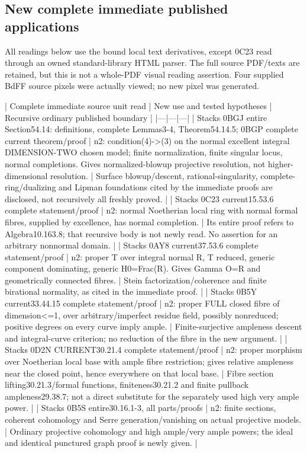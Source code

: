 \documentclass[11pt]{article}
\begin{document}
\subsection*{New complete immediate published applications}

All readings below use the bound local text derivatives, except 0C23 read through an owned standard-library HTML parser. The full source PDF/texts are retained, but this is not a whole-PDF visual reading assertion. Four supplied BdFF source pixels were actually viewed; no new pixel was generated.

| Complete immediate source unit read | New use and tested hypotheses | Recursive ordinary published boundary |
|---|---|---|
| Stacks 0BGJ entire Section54.14: definitions, complete Lemmas3-4, Theorem54.14.5; 0BGP complete current theorem/proof | n2: condition(4)->(3) on the normal excellent integral DIMENSION-TWO chosen model; finite normalization, finite singular locus, normal completions. Gives normalized-blowup projective resolution, not higher-dimensional resolution. | Surface blowup/descent, rational-singularity, complete-ring/dualizing and Lipman foundations cited by the immediate proofs are disclosed, not recursively all freshly proved. |
| Stacks 0C23 current15.53.6 complete statement/proof | n2: normal Noetherian local ring with normal formal fibres, supplied by excellence, has normal completion. | Its entire proof refers to Algebra10.163.8; that recursive body is not newly read. No assertion for an arbitrary nonnormal domain. |
| Stacks 0AY8 current37.53.6 complete statement/proof | n2: proper T over integral normal R, T reduced, generic component dominating, generic H0=Frac(R). Gives Gamma O=R and geometrically connected fibres. | Stein factorization/coherence and finite birational normality, as cited in the immediate proof. |
| Stacks 0B5Y current33.44.15 complete statement/proof | n2: proper FULL closed fibre of dimension<=1, over arbitrary/imperfect residue field, possibly nonreduced; positive degrees on every curve imply ample. | Finite-surjective ampleness descent and integral-curve criterion; no reduction of the fibre in the new argument. |
| Stacks 0D2N CURRENT30.21.4 complete statement/proof | n2: proper morphism over Noetherian local base with ample fibre restriction; gives relative ampleness near the closed point, hence everywhere on that local base. | Fibre section lifting30.21.3/formal functions, finiteness30.21.2 and finite pullback ampleness29.38.7; not a direct substitute for the separately used high very ample power. |
| Stacks 0B5S entire30.16.1-3, all parts/proofs | n2: finite sections, coherent cohomology and Serre generation/vanishing on actual projective models. | Ordinary projective cohomology and high ample/very ample powers; the ideal and identical punctured graph proof is newly given. |
\end{document}
